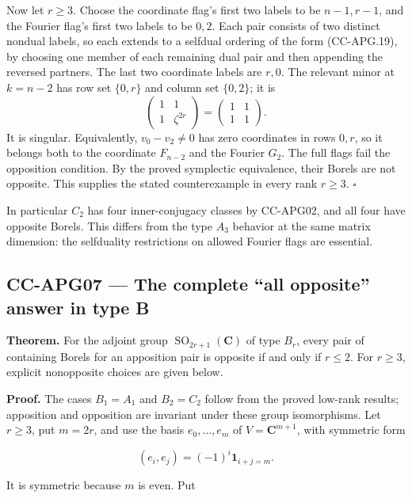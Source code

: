 Now let \(r\geq3\). Choose the coordinate flag's first two labels to be
\(n-1,r-1\), and the Fourier flag's first two labels to be \(0,2\). Each
pair consists of two distinct nondual labels, so each extends to a
selfdual ordering of the form (CC-APG.19), by choosing one member of
each remaining dual pair and then appending the reversed partners. The
last two coordinate labels are \(r,0\). The relevant minor at \(k=n-2\)
has row set \(\{0,r\}\) and column set \(\{0,2\}\); it is \[
 \begin{pmatrix}1&1\\1&\zeta^{2r}\end{pmatrix}
 =\begin{pmatrix}1&1\\1&1\end{pmatrix}.
\] It is singular. Equivalently, \(v_0-v_2\ne0\) has zero coordinates in
rows \(0,r\), so it belongs both to the coordinate \(F_{n-2}\) and the
Fourier \(G_2\). The full flags fail the opposition condition. By the
proved symplectic equivalence, their Borels are not opposite. This
supplies the stated counterexample in every rank \(r\geq3\). \(\square\)

In particular \(C_2\) has four inner-conjugacy classes by CC-APG02, and
all four have opposite Borels. This differs from the type \(A_3\)
behavior at the same matrix dimension: the selfduality restrictions on
allowed Fourier flags are essential.

\subsection{CC-APG07 --- The complete ``all opposite'' answer in type
B}\label{cc-apg07-the-complete-all-opposite-answer-in-type-b}

\textbf{Theorem.} For the adjoint group
\(\operatorname{SO}_{2r+1}(\mathbf C)\) of type \(B_r\), every pair of
containing Borels for an apposition pair is opposite if and only if
\(r\leq2\). For \(r\geq3\), explicit nonopposite choices are given
below.

\textbf{Proof.} The cases \(B_1=A_1\) and \(B_2=C_2\) follow from the
proved low-rank results; apposition and opposition are invariant under
these group isomorphisms. Let \(r\geq3\), put \(m=2r\), and use the
basis \(e_0,\ldots,e_m\) of \(V=\mathbf C^{m+1}\), with symmetric form

\[
 (e_i,e_j)=(-1)^i\mathbf 1_{i+j=m}.
 \tag{CC-APG.20}
\]

It is symmetric because \(m\) is even. Put

